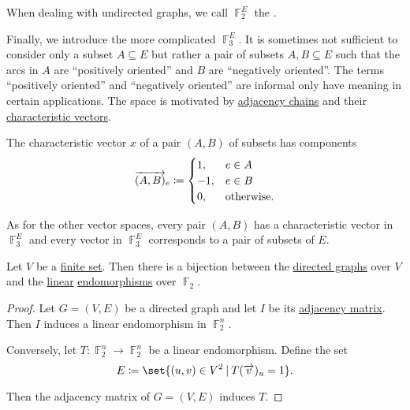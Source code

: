 \begin{definition}
\begin{thmenum}
    When dealing with undirected graphs, we call \( \BbbF_2^E \) the .

     Finally, we introduce the more complicated  \( \BbbF_3^E \). It is sometimes not sufficient to consider only a subset \( A \subseteq E \) but rather a pair of subsets \( A, B \subseteq E \) such that the arcs in \( A \) are \enquote{positively oriented} and \( B \) are \enquote{negatively oriented}. The terms \enquote{positively oriented} and \enquote{negatively oriented} are informal only have meaning in certain applications. The space is motivated by \hyperref[def:graph_adjacency_chain]{adjacency chains} and their \hyperref[def:graph_adjacency_chain/characteristic_vector]{characteristic vectors}.

    The characteristic vector \( x \) of a pair \( (A, B) \) of subsets has components
    \begin{equation*}
      \vect{(A, B)}_e \coloneqq \begin{cases}
        1,  &e \in A \\
        -1, &e \in B \\
        0,  &\T{otherwise.}
      \end{cases}
    \end{equation*}

    As for the other vector spaces, every pair \( (A, B) \) has a characteristic vector in \( \BbbF_3^E \) and every vector in \( \BbbF_3^E \) corresponds to a pair of subsets of \( E \).
  \end{thmenum}
\end{definition}

\begin{proposition}\label{thm:graphs_as_linear_transformations}
  Let \( V \) be a \hyperref[def:set_finiteness]{finite set}. Then there is a bijection between the \hyperref[def:graph/directed]{directed graphs} over \( V \) and the \hyperref[def:linear_operator]{linear} \hyperref[def:endomorphism]{endomorphisms} over \( \BbbF_2 \).
\end{proposition}
\begin{proof}
  Let \( G = (V, E) \) be a directed graph and let \( I \) be its \hyperref[def:graph_matrices/adjacency]{adjacency matrix}. Then \( I \) induces a linear endomorphism in \( \BbbF_2^n \).

  Conversely, let \( T: \BbbF_2^n \to \BbbF_2^n \) be a linear endomorphism. Define the set
  \begin{equation*}
    E \coloneqq \set{ (u, v) \in V^2 \given T(\vect{v})_u = 1 }.
  \end{equation*}

  Then the adjacency matrix of \( G = (V, E) \) induces \( T \).
\end{proof}

